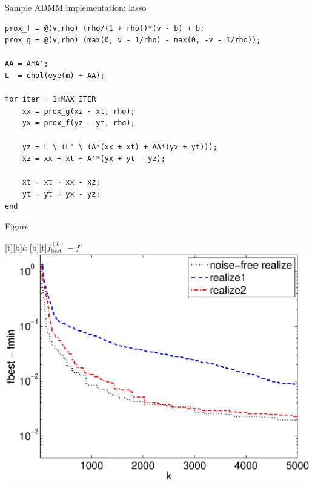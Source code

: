 \documentclass[10pt,mathserif]{beamer}
\begin{document}
\begin{frame}[fragile]{Sample ADMM implementation: lasso}
\begin{verbatim}
prox_f = @(v,rho) (rho/(1 + rho))*(v - b) + b;
prox_g = @(v,rho) (max(0, v - 1/rho) - max(0, -v - 1/rho));

AA = A*A';
L  = chol(eye(m) + AA);

for iter = 1:MAX_ITER
    xx = prox_g(xz - xt, rho);
    yx = prox_f(yz - yt, rho);

    yz = L \ (L' \ (A*(xx + xt) + AA*(yx + yt)));
    xz = xx + xt + A'*(yx + yt - yz);
  
    xt = xt + xx - xz;
    yt = yt + yx - yz;
end
\end{verbatim}
\end{frame}

\begin{frame}{Figure}
\begin{center}
    [t][b]{$k$}
    [b][t]{$f_\mathrm{best}^{(k)} - f^\star$}
    \includegraphics[height=0.8\textheight]{figures/pwl_error_fbest_realize.eps}
\end{center}
\end{frame}
\end{document}
